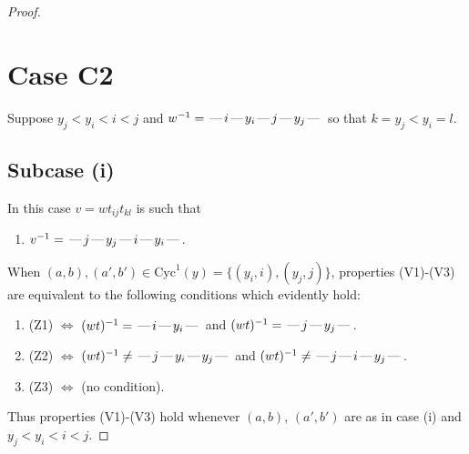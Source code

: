 \documentclass[10pt]{article}
\theoremstyle{definition}
\theoremstyle{definition}
\def\dash{\text{\hspace{0.5mm}---\hspace{0.5mm}}}
\def\Cyc{\mathrm{Cyc}}
\begin{document}
\begin{proof}
\section{Case C2}
Suppose $y_j < y_i < i < j$ and $w^{-1} = \dash i\dash y_i\dash j\dash y_j\dash $ so that $k=y_j < y_i=l$.
\subsection{Subcase (i)}
In this case $v = wt_{ij}t_{kl}$ is such that
\begin{enumerate}\item[]$v^{-1} = \dash j\dash y_j\dash i\dash y_i\dash $.\end{enumerate}
When $(a,b),(a',b')\in\Cyc^1(y)= \{(y_i,i),(y_j,j)\}$,
properties (V1)-(V3) are equivalent to the following conditions which evidently hold:
\begin{enumerate}
\item[](Z1) $\Leftrightarrow$ $(wt)^{-1} = \dash i \dash y_i \dash$  and $(wt)^{-1} = \dash j \dash y_j \dash$.
\item[](Z2) $\Leftrightarrow$ $(wt)^{-1} \neq \dash j \dash y_i \dash y_j \dash$ and $(wt)^{-1}\neq \dash j \dash i \dash y_j \dash$.
\item[](Z3) $\Leftrightarrow$ (no condition).
\end{enumerate}
Thus properties (V1)-(V3) hold whenever
$(a,b)$, $(a',b')$ are as in case (i) and $y_j < y_i < i < j$.

\end{proof}
\end{document}
